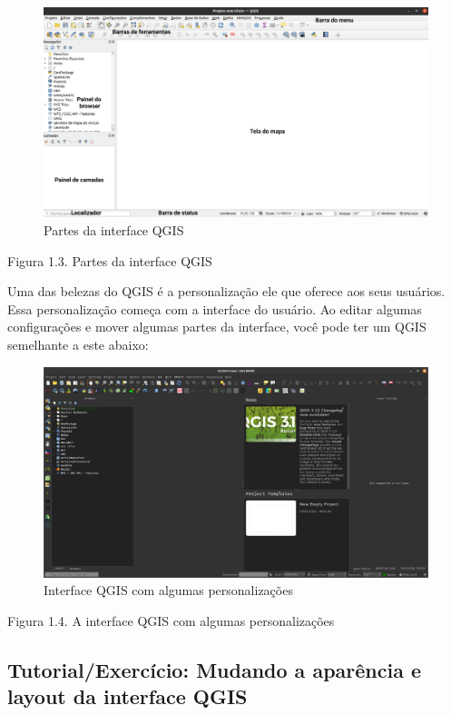 \documentclass[
]{krantz}
\begin{document}
\begin{figure}
\centering
\includegraphics{media/modulo1/qgis-interface-parts.png}
\caption{Partes da interface QGIS}
\end{figure}

Figura 1.3. Partes da interface QGIS

Uma das belezas do QGIS é a personalização ele que oferece aos seus usuários. Essa personalização começa com a interface do usuário. Ao editar algumas configurações e mover algumas partes da interface, você pode ter um QGIS semelhante a este abaixo:

\begin{figure}
\centering
\includegraphics{media/modulo1/qgis-interface-custom.png}
\caption{Interface QGIS com algumas personalizações}
\end{figure}

Figura 1.4. A interface QGIS com algumas personalizações

\hypertarget{tutorialexercuxedcio-mudando-a-aparuxeancia-e-layout-da-interface-qgis}{%
\subsection{Tutorial/Exercício: Mudando a aparência e layout da interface QGIS}\label{tutorialexercuxedcio-mudando-a-aparuxeancia-e-layout-da-interface-qgis}}
\end{document}
